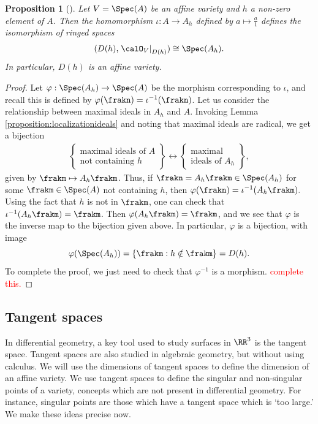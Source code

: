 \documentclass[12pt]{amsart}
\theoremstyle{plain}
\newtheorem{proposition}[theorem]{Proposition}
\begin{document}
\begin{proposition}[{\cite[Proposition 3.32]{Milne13}}]\label{proposition:localisationembedding}
Let $V = \Spec(A)$ be an affine variety and $h$ a non-zero element of $A$.
Then the homomorphism $\iota : A \to A_h$ defined by $a \mapsto \frac{a}{1}$ defines the isomorphism of ringed spaces
$$(D(h), \left. \calO_V \right|_{D(h)}) \cong \Spec(A_h).$$
In particular, $D(h)$ is an affine variety.
\end{proposition}
\begin{proof}
Let $\varphi : \Spec(A_h) \to \Spec(A)$ be the morphism corresponding to $\iota$, and recall this is defined by $\varphi(\frakn) = \iota^{-1}(\frakn)$.
Let us consider the relationship between maximal ideals in $A_h$ and $A$.
Invoking Lemma \ref{proposition:localizationideals} and noting that maximal ideals are radical, we get a bijection
\begin{align*}
\left\{
\begin{array}{c}
	\text{maximal ideals of } A \\
	\text{not containing } h
\end{array}
\right\} \longleftrightarrow 
\left\{
\begin{array}{c}
	\text{maximal} \\
	\text{ideals of } A_h 
\end{array}
\right\},
\end{align*}
given by $\frakm \mapsto A_h \frakm$.
Thus, if $\frakn = A_h \frakm \in \Spec(A_h)$ for some $\frakm \in \Spec(A)$ not containing $h$, then $\varphi(\frakn) = \iota^{-1}(A_h \frakm).$
Using the fact that $h$ is not in $\frakm$, one can check that $\iota^{-1}(A_h \frakm) = \frakm$.
Then $\varphi(A_h \frakm) = \frakm$, and we see that $\varphi$ is the inverse map to the bijection given above.
In particular, $\varphi$ is a bijection, with image
$$\varphi(\Spec(A_h)) = \{\frakm : h \notin \frakm\} = D(h).$$
To complete the proof, we just need to check that $\varphi^{-1}$ is a morphism.
\textcolor{red}{complete this.}
\end{proof}





\subsection{Tangent spaces}
In differential geometry, a key tool used to study surfaces in $\RR^3$ is the tangent space.
Tangent spaces are also studied in algebraic geometry, but without using calculus.
We will use the dimensions of tangent spaces to define the dimension of an affine variety.
We use tangent spaces to define the singular and non-singular points of a variety, concepts which are not present in differential geometry.
For instance, singular points are those which have a tangent space which is `too large.'
We make these ideas precise now.
\end{document}
